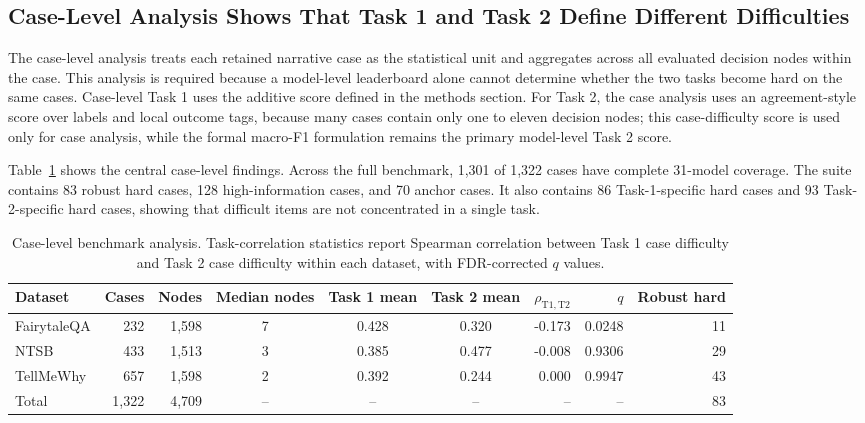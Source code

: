 \documentclass[pdflatex,sn-mathphys-num]{sn-jnl}%
\theoremstyle{thmstyleone}%
\theoremstyle{thmstyletwo}%
\theoremstyle{thmstylethree}%
\begin{document}
\subsection{Case-Level Analysis Shows That Task 1 and Task 2 Define Different Difficulties}
The case-level analysis treats each retained narrative case as the statistical unit and aggregates across all evaluated decision nodes within the case. This analysis is required because a model-level leaderboard alone cannot determine whether the two tasks become hard on the same cases. Case-level Task 1 uses the additive score defined in the methods section. For Task 2, the case analysis uses an agreement-style score over labels and local outcome tags, because many cases contain only one to eleven decision nodes; this case-difficulty score is used only for case analysis, while the formal macro-F1 formulation remains the primary model-level Task 2 score.

Table~\ref{tab:case-level-results} shows the central case-level findings. Across the full benchmark, 1,301 of 1,322 cases have complete 31-model coverage. The suite contains 83 robust hard cases, 128 high-information cases, and 70 anchor cases. It also contains 86 Task-1-specific hard cases and 93 Task-2-specific hard cases, showing that difficult items are not concentrated in a single task.

\begin{table}[htbp]
\centering
\small
\caption{Case-level benchmark analysis. Task-correlation statistics report Spearman correlation between Task 1 case difficulty and Task 2 case difficulty within each dataset, with FDR-corrected $q$ values.}
\label{tab:case-level-results}
\begin{tabular}{l r r c c c r r r}
\toprule
Dataset & Cases & Nodes & Median nodes & Task 1 mean & Task 2 mean & $\rho_{\mathrm{T1,T2}}$ & $q$ & Robust hard \\
\midrule
FairytaleQA & 232 & 1,598 & 7 & 0.428 & 0.320 & -0.173 & 0.0248 & 11 \\
NTSB & 433 & 1,513 & 3 & 0.385 & 0.477 & -0.008 & 0.9306 & 29 \\
TellMeWhy & 657 & 1,598 & 2 & 0.392 & 0.244 & 0.000 & 0.9947 & 43 \\
\midrule
Total & 1,322 & 4,709 & -- & -- & -- & -- & -- & 83 \\
\bottomrule
\end{tabular}
\end{table}
\end{document}
